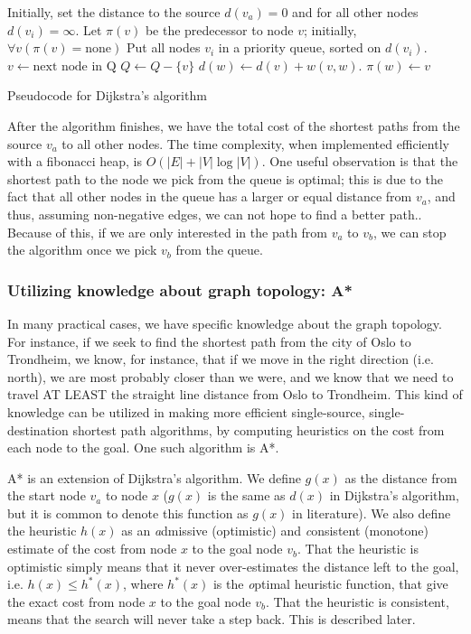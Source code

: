 \begin{algorithm}
\begin{algorithmic}
\STATE Initially, set the distance to the source $d(v_a)=0$ and for all other nodes $d(v_i) = \infty$.
\STATE Let $\pi(v)$ be the predecessor to node $v$; initially, $\forall v (\pi(v) = \mbox{none})$ 
\STATE Put all nodes $v_i$ in a priority queue, sorted on $d(v_i)$.
    \STATE $v \gets \mbox{next node in Q}$
    \STATE $Q\gets Q - \{v\}$
            \STATE $d(w) \gets  d(v)+w(v, w)$.
            \STATE $\pi(w)\gets v$
        \ENDIF
    \ENDFOR
\ENDWHILE
\end{algorithmic}
\caption{Pseudocode for Dijkstra's algorithm}
\label{alg:dijkstra}
\end{algorithm}

After the algorithm finishes, we have the total cost of the shortest paths from the source $v_a$ to all other nodes. The time complexity, when implemented efficiently with a fibonacci heap, is $O(|E|+|V|\log |V|)$\cite{fibodijkstra}. One useful observation is that the shortest path to the node we pick from the queue is optimal; this is due to the fact that all other nodes in the queue has a larger or equal distance from $v_a$, and thus, assuming non-negative edges, we can not hope to find a better path.. Because of this, if we are only interested in the path from $v_a$ to $v_b$, we can stop the algorithm once we pick $v_b$ from the queue. 

\subsubsection{Utilizing knowledge about graph topology: A*}
In many practical cases, we have specific knowledge about the graph topology. For instance, if we seek to find the shortest path from the city of Oslo to Trondheim, we know, for instance, that if we move in the right direction (i.e. north), we are most probably closer than we were, and we know that we need to travel AT LEAST the straight line distance from Oslo to Trondheim. This kind of knowledge can be utilized in making more efficient single-source, single-destination shortest path algorithms, by computing heuristics on the cost from each node to the goal. One such algorithm is A*.\cite{astar}

A* is an extension of Dijkstra's algorithm. We define $g(x)$ as the distance from the start node $v_a$ to node $x$ ($g(x)$ is the same as $d(x)$ in Dijkstra's algorithm, but it is common to denote this function as $g(x)$ in literature). We also define the heuristic $h(x)$ as an {\textit admissive} (optimistic) and {\textit consistent} (monotone) estimate of the cost from node $x$ to the goal node $v_b$. That the heuristic is optimistic simply means that it never over-estimates the distance left to the goal, i.e. $h(x) \leq h^*(x)$, where $h^*(x)$ is the {\textit optimal} heuristic function, that give the exact cost from node $x$ to the goal node $v_b$. That the heuristic is consistent, means that the search will never take a step back. This is described later.

